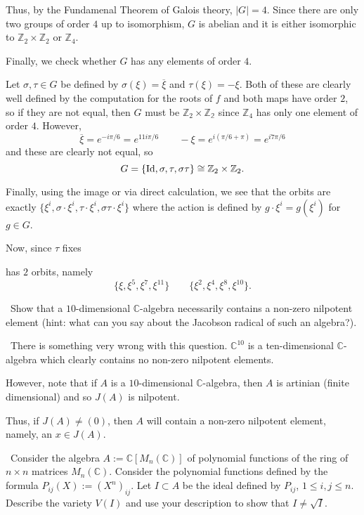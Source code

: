 \documentclass[12pt]{Qual}
\begin{document}
\begin{solution}
Thus, by the Fundamenal Theorem of Galois theory, $|G|=4$. Since there are only two groups of order $4$ up to isomorphism, $G$ is abelian and it is either isomorphic to $\mathbb{Z}_2\times\mathbb{Z}_2$ or $\mathbb{Z}_4$.

Finally, we check whether $G$ has any elements of order $4$.

Let $\sigma,\tau\in G$ be defined by $\sigma(\xi)=\overline{\xi}$ and $\tau(\xi)=-\xi$. Both of these are clearly well defined by the computation for the roots of $f$ and both maps have order $2$, so if they are not equal, then $G$ must be $\mathbb{Z}_2\times\mathbb{Z_2}$ since $\mathbb{Z}_4$ has only one element of order $4.$ However, $$\overline{\xi}=e^{-i\pi/6}=e^{11i\pi/6}\qquad -\xi=e^{i(\pi/6+\pi)}=e^{i7\pi/6}$$ and these are clearly not equal, so $$G=\{\text{Id},\sigma,\tau,\sigma\tau\}\cong\mathbb{Z}_2\times\mathbb{Z}_2.$$

Finally, using the image or via direct calculation, we see that the orbits are exactly $\{\xi^i,\sigma\cdot\xi^i,\tau\cdot\xi^i,\sigma\tau\cdot\xi^i\}$ where the action is defined by $g\cdot \xi^i=g(\xi^i)$ for $g\in G$.

Now, since $\tau$ fixes

has $2$ orbits, namely $$\{\xi,\xi^5,\xi^7,\xi^{11}\}\qquad \{\xi^2,\xi^4,\xi^8,\xi^{10}\}.$$
\end{solution}
\newpage




\begin{problem} $\,$
Show that a $10$-dimensional $\mathbb{C}$-algebra necessarily contains a non-zero nilpotent element (hint: what can you say about the Jacobson radical of such an algebra?).
\end{problem}


\begin{solution}$\,$
There is something very wrong with this question. $\mathbb{C}^{10}$ is a ten-dimensional $\mathbb{C}$-algebra which clearly contains no non-zero nilpotent elements.

However, note that if $A$ is a $10$-dimensional $\mathbb{C}$-algebra, then $A$ is artinian (finite dimensional) and so $J(A)$ is nilpotent.

Thus, if $J(A)\not=(0)$, then $A$ will contain a non-zero nilpotent element, namely, an $x\in J(A)$.
\end{solution}
\newpage



\begin{problem} $\,$
Consider the algebra $A:=\mathbb{C}[M_n(\mathbb{C})]$ of polynomial functions of the ring of $n\times n$ matrices $M_n(\mathbb{C})$. Consider the polynomial functions defined by the formula $P_{ij}(X):=(X^n)_{ij}$. Let $I\subset A$ be the ideal defined by $P_{ij}$, $1\le i,j\le n.$ Describe the variety $V(I)$ and use your description to show that $I\not=\sqrt{I}.$
\end{problem}
\end{document}
